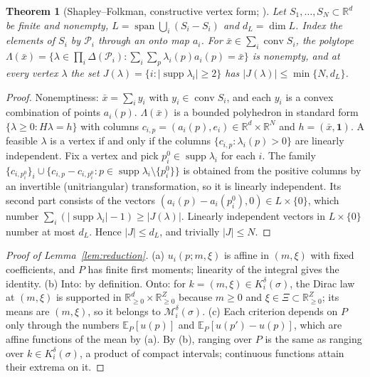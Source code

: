 \documentclass[preprint,11pt]{elsarticle}
\newtheorem{theorem}{Theorem}
\theoremstyle{definition}
\theoremstyle{remark}
\newcommand{\R}{\mathbb{R}}
\newcommand{\E}{\mathbb{E}}
\newcommand{\cP}{\mathcal{P}}
\newcommand{\cM}{\mathcal{M}}
\newcommand{\conv}{\operatorname{conv}}
\newcommand{\spn}{\operatorname{span}}
\newcommand{\supp}{\operatorname{supp}}
\begin{document}
\begin{theorem}[Shapley--Folkman, constructive vertex form; \citealp{Starr1969}]\label{thm:sf}
Let $S_1,\dots,S_N\subset\R^d$ be finite and nonempty, $L=\spn\bigcup_i(S_i-S_i)$ and $d_L=\dim L$. Index the elements of $S_i$ by $\cP_i$ through an onto map $a_i$. For $\bar x\in\sum_i\conv S_i$, the polytope $\Lambda(\bar x)=\{\lambda\in\prod_i\Delta(\cP_i):\sum_i\sum_p\lambda_i(p)a_i(p)=\bar x\}$ is nonempty, and at every vertex $\lambda$ the set $J(\lambda)=\{i:|\supp\lambda_i|\ge2\}$ has $|J(\lambda)|\le\min\{N,d_L\}$.
\end{theorem}
\begin{proof}
Nonemptiness: $\bar x=\sum_iy_i$ with $y_i\in\conv S_i$, and each $y_i$ is a convex combination of points $a_i(p)$. $\Lambda(\bar x)$ is a bounded polyhedron in standard form $\{\lambda\ge0:H\lambda=h\}$ with columns $c_{i,p}=(a_i(p),e_i)\in\R^d\times\R^N$ and $h=(\bar x,\mathbf 1)$. A feasible $\lambda$ is a vertex if and only if the columns $\{c_{i,p}:\lambda_i(p)>0\}$ are linearly independent. Fix a vertex and pick $p_i^0\in\supp\lambda_i$ for each $i$. The family $\{c_{i,p_i^0}\}_i\cup\{c_{i,p}-c_{i,p_i^0}:p\in\supp\lambda_i\setminus\{p_i^0\}\}$ is obtained from the positive columns by an invertible (unitriangular) transformation, so it is linearly independent. Its second part consists of the vectors $(a_i(p)-a_i(p_i^0),0)\in L\times\{0\}$, which number $\sum_i(|\supp\lambda_i|-1)\ge|J(\lambda)|$. Linearly independent vectors in $L\times\{0\}$ number at most $d_L$. Hence $|J|\le d_L$, and trivially $|J|\le N$.
\end{proof}

\begin{proof}[Proof of Lemma~\ref{lem:reduction}]
(a) $u_i(p;m,\xi)$ is affine in $(m,\xi)$ with fixed coefficients, and $P$ has finite first moments; linearity of the integral gives the identity. (b) Into: by definition. Onto: for $k=(m,\xi)\in K_i^\delta(\sigma)$, the Dirac law at $(m,\xi)$ is supported in $\R^d_{\ge0}\times\R^Z_{\ge0}$ because $m\ge0$ and $\xi\in\Xi\subset\R^Z_{\ge0}$; its means are $(m,\xi)$, so it belongs to $\cM_i^\delta(\sigma)$. (c) Each criterion depends on $P$ only through the numbers $\E_P[u(p)]$ and $\E_P[u(p')-u(p)]$, which are affine functions of the mean by (a). By (b), ranging over $P$ is the same as ranging over $k\in K_i^\delta(\sigma)$, a product of compact intervals; continuous functions attain their extrema on it.
\end{proof}
\end{document}
